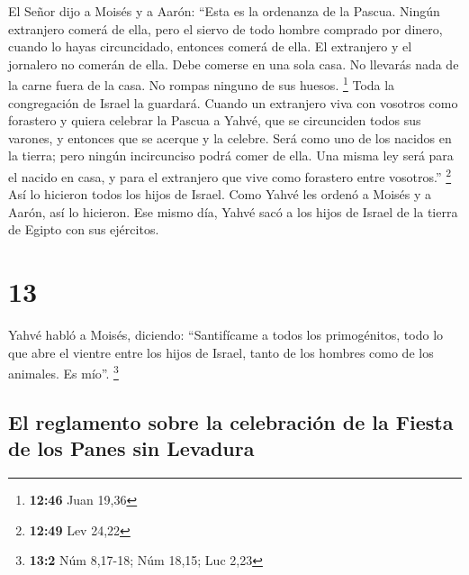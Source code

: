 El Señor dijo a Moisés y a Aarón: ``Esta es la ordenanza
de la Pascua. Ningún extranjero comerá de ella,  pero el
siervo de todo hombre comprado por dinero, cuando lo hayas circuncidado,
entonces comerá de ella.  El extranjero y el jornalero no
comerán de ella.  Debe comerse en una sola casa. No
llevarás nada de la carne fuera de la casa. No rompas ninguno de sus
huesos. \footnote{\textbf{12:46} Juan 19,36}  Toda la
congregación de Israel la guardará.  Cuando un extranjero
viva con vosotros como forastero y quiera celebrar la Pascua a Yahvé,
que se circunciden todos sus varones, y entonces que se acerque y la
celebre. Será como uno de los nacidos en la tierra; pero ningún
incircunciso podrá comer de ella.  Una misma ley será
para el nacido en casa, y para el extranjero que vive como forastero
entre vosotros.'' \footnote{\textbf{12:49} Lev 24,22} 
Así lo hicieron todos los hijos de Israel. Como Yahvé les ordenó a
Moisés y a Aarón, así lo hicieron.  Ese mismo día, Yahvé
sacó a los hijos de Israel de la tierra de Egipto con sus ejércitos.

\hypertarget{section-12}{%
\section{13}\label{section-12}}

 Yahvé habló a Moisés, diciendo: 
``Santifícame a todos los primogénitos, todo lo que abre el vientre
entre los hijos de Israel, tanto de los hombres como de los animales. Es
mío''. \footnote{\textbf{13:2} Núm 8,17-18; Núm 18,15; Luc 2,23}

\hypertarget{el-reglamento-sobre-la-celebraciuxf3n-de-la-fiesta-de-los-panes-sin-levadura}{%
\subsection{El reglamento sobre la celebración de la Fiesta de los Panes
sin
Levadura}\label{el-reglamento-sobre-la-celebraciuxf3n-de-la-fiesta-de-los-panes-sin-levadura}}

